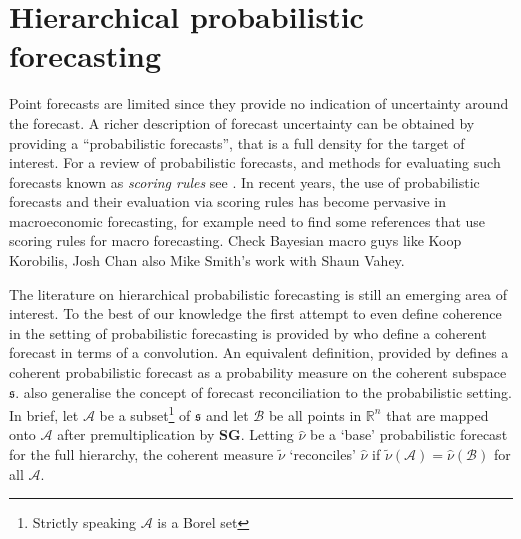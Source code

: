\documentclass[graybox]{svmult}
\begin{document}
\section{Hierarchical probabilistic forecasting}

Point forecasts are limited since they provide no indication of uncertainty around the forecast. A richer description of forecast uncertainty can be obtained by providing a ``probabilistic forecasts'', that is a full density for the target of interest. For a review of probabilistic forecasts, and methods for evaluating such forecasts known as {\em scoring rules} see  \citep{Gneiting2014}. In recent years, the use of probabilistic forecasts and their evaluation via scoring rules has become pervasive in macroeconomic forecasting, for example {\color{red} need to find some references that use scoring rules for macro forecasting.  Check Bayesian macro guys like Koop Korobilis, Josh Chan also Mike Smith's work with Shaun Vahey}.


The literature on hierarchical probabilistic forecasting is still an emerging area of interest. %
To the best of our knowledge the first attempt to even define coherence in the setting of probabilistic forecasting is provided by \cite{Taieb2017} who define a coherent forecast in terms of a convolution.  An equivalent definition, provided by \cite{Gamakumara2018} defines a  coherent probabilistic forecast as a probability measure on the coherent subspace $\mathfrak{s}$.  \cite{Gamakumara2018} also generalise the concept of forecast reconciliation to the probabilistic setting.  In brief, let $\mathcal{A}$ be a subset\footnote{Strictly speaking $\mathcal{A}$ is a Borel set} of $\mathfrak{s}$ and let $\mathcal{B}$ be all points in $\mathbb{R}^n$ that are mapped onto  $\mathcal{A}$ after premultiplication by $\bm{S}\bm{G}$.  Letting $\hat{\nu}$ be a `base' probabilistic forecast for the full hierarchy,
the coherent measure $\tilde{\nu}$ `reconciles' $\hat{\nu}$ if $\tilde{\nu}(\mathcal{A})=\hat{\nu}(\mathcal{B})$ for all $\mathcal{A}$.
\end{document}
